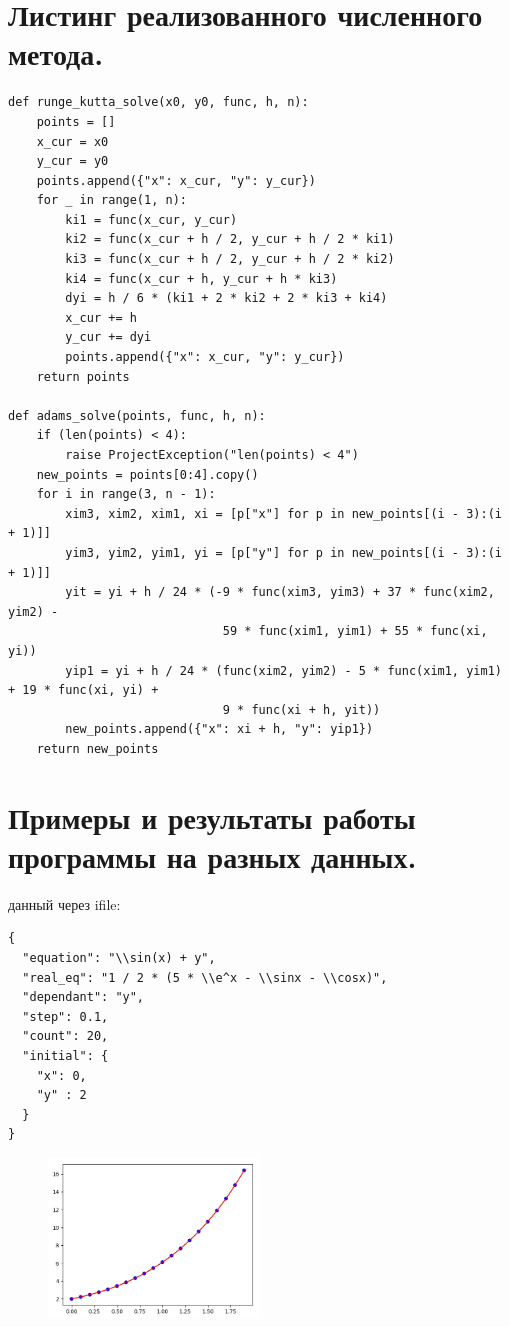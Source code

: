 \documentclass[11pt, a4paper]{article}
\begin{document}
\newpage
\section{Листинг реализованного численного метода.}

\begin{Verbatim}[fontsize=\small]
def runge_kutta_solve(x0, y0, func, h, n):
    points = []
    x_cur = x0
    y_cur = y0
    points.append({"x": x_cur, "y": y_cur})
    for _ in range(1, n):
        ki1 = func(x_cur, y_cur)
        ki2 = func(x_cur + h / 2, y_cur + h / 2 * ki1)
        ki3 = func(x_cur + h / 2, y_cur + h / 2 * ki2)
        ki4 = func(x_cur + h, y_cur + h * ki3)
        dyi = h / 6 * (ki1 + 2 * ki2 + 2 * ki3 + ki4)
        x_cur += h
        y_cur += dyi
        points.append({"x": x_cur, "y": y_cur})
    return points

def adams_solve(points, func, h, n):
    if (len(points) < 4):
        raise ProjectException("len(points) < 4")
    new_points = points[0:4].copy()
    for i in range(3, n - 1):
        xim3, xim2, xim1, xi = [p["x"] for p in new_points[(i - 3):(i + 1)]]
        yim3, yim2, yim1, yi = [p["y"] for p in new_points[(i - 3):(i + 1)]]
        yit = yi + h / 24 * (-9 * func(xim3, yim3) + 37 * func(xim2, yim2) -
                              59 * func(xim1, yim1) + 55 * func(xi, yi))
        yip1 = yi + h / 24 * (func(xim2, yim2) - 5 * func(xim1, yim1) + 19 * func(xi, yi) +
                              9 * func(xi + h, yit))
        new_points.append({"x": xi + h, "y": yip1})
    return new_points
\end{Verbatim}

\section{Примеры и результаты работы программы на разных данных.}

 данный через ifile:

\begin{Verbatim}[fontsize=\small]
{
  "equation": "\\sin(x) + y",
  "real_eq": "1 / 2 * (5 * \\e^x - \\sinx - \\cosx)",
  "dependant": "y",
  "step": 0.1,
  "count": 20,
  "initial": {
    "x": 0,
    "y" : 2
  }
}
\end{Verbatim}


\begin{figure}[h]
  \centering
  \includegraphics[width=0.5\textwidth]{result.png}
  \label{fig:result-png}
\end{figure}
\end{document}
